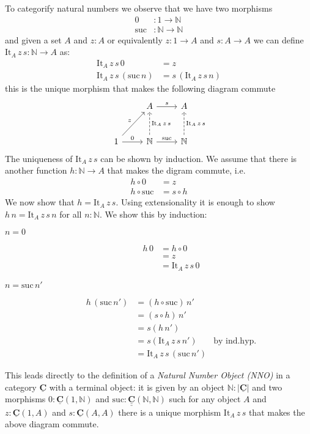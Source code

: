 \documentclass{article}
\newcommand{\cat}[1]{\underline{\mathbf{#1}}}
\newcommand{\obj}[1]{|#1|}
\newcommand{\homC}[3]{\cat{#1}(#2,#3)}
\newcommand{\Nat}{\mathbb{N}}
\newcommand{\suc}{\mathrm{suc}}
\newcommand{\It}{\mathrm{It}}
\begin{document}
To categorify natural numbers we observe that we have two morphisms
\begin{align*}
  0  & : 1 \to \Nat \\
  \suc & : \Nat \to \Nat
\end{align*}
and given a set $A$ and $z:A$ or equivalently $z : 1 \to A$ and $s : A \to A$ we can define $\It_A\,z\,s : \Nat \to A$ as:
\begin{align*}
\It_A\,z\,s\,0 & = z\\
\It_A\,z\,s\,(\suc\,n) & = s\,(\It_A\,z\,s\,n)
\end{align*}
this is the unique morphism that makes the following diagram commute
\[\begin{tikzcd}[row sep = large]
& A \arrow[r,"s"] & A \\
1 \arrow[ur,"z"] \arrow[r,"0"] & \Nat \arrow[r,"\suc"] \arrow[u, dashrightarrow,"\It_A\,z\,s" right] & \Nat  \arrow[u, dashrightarrow,"\It_A\,z\,s" right]
\end{tikzcd}\]  
The uniqueness of $\It_A\,z\,s$ can be shown by induction. We assume that there is another function $h : \Nat \to A$ that makes the digram commute, i.e. 
\begin{align*}
h \circ 0 & = z\\
h \circ \suc & = s \circ h
\end{align*}
We now show that $h = \It_A\,z\,s$. Using extensionality it is enough to show $h\,n = \It_A\,z\,s\,n$ for all $n:\Nat$. We show this by induction:
\begin{description}
\item[$n=0$] 
  \begin{align*}
    h\,0 & = h \circ 0 \\
    & = z\\
    & = \It_A\,z\,s\,0
  \end{align*}
\item[$n = \suc\,n'$] 
  \begin{align*}
    h\,(\suc\,n') & = (h \circ \suc) \, n' \\
    & = (s \circ h)\,n' \\
    & = s (h \, n')\\
    & = s (\It_A\,z\,s\,n') & \mbox{by ind.hyp.} \\
    & = \It_A\,z\,s\,(\suc\,n')
  \end{align*}
\end{description}

This leads directly to the definition of a \emph{Natural Number Object (NNO)} in a category $\cat{C}$ with a terminal object: it is given by an object $\Nat : \obj{\cat{C}}$ and two morphisms $0 : \homC{C}{1}{\Nat}$ and $\suc : \homC{\cat{C}}{\Nat}{\Nat}$ such for any object $A$ and $z : \homC{C}{1}{A}$ and $s:\homC{C}{A}{A}$ there is a unique morphism $\It_A\,z\,s$ that makes the above diagram commute.
\end{document}
